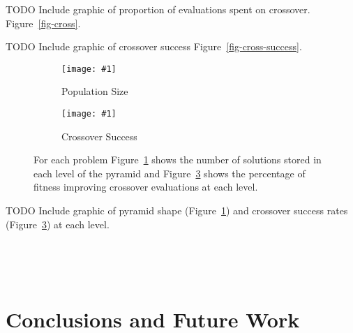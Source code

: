 \documentclass[twoside]{article}
\newcommand{\includegraphicsfit}[1]
{\texttt{[image: \#1]}}
\begin{document}
TODO Include graphic of proportion of evaluations spent on crossover. Figure~\ref{fig-cross}.

TODO Include graphic of crossover success Figure~\ref{fig-cross-success}.

\begin{figure}[t]
  \begin{centering}
    \begin{subfigure}{.5\textwidth}
      \begin{centering}
        \includegraphicsfit{level-size}
      \end{centering}
      \caption{Population Size}
      \label{fig-level-size}
    \end{subfigure}%
    \begin{subfigure}{.5\textwidth}
      \begin{centering}
        \includegraphicsfit{level-success}
      \end{centering}
      \caption{Crossover Success}
      \label{fig-level-success}
    \end{subfigure}
  \end{centering}
  \caption{For each problem Figure~\ref{fig-level-size} shows the number of solutions stored in each level of the pyramid
           and Figure~\ref{fig-level-success} shows the percentage of fitness improving crossover evaluations at each level.}
\end{figure}

TODO Include graphic of pyramid shape (Figure~\ref{fig-level-size}) and crossover success rates (Figure~\ref{fig-level-success}) at each level.

~\cite{lobo:2011:dynamicpop}

~\cite{goldman:2011:dynamic-parameters}

\section{Conclusions and Future Work}

\small



\end{document}

